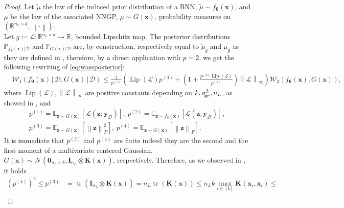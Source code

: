 \documentclass[a4paper, 11pt, reqno]{amsart}
\theoremstyle{plain}
\theoremstyle{remark}
\theoremstyle{definition}
\newcommand{\mean}[2][\kern-0.5pt]{\mathbb{E}_{#1}\left[#2\right]}
\newcommand{\given}{\, | \,}
\newcommand{\normal}[2]{\mathcal{N}\left(#1, #2\right)}
\newcommand{\wass}[3][2]{\mathcal{W}_{#1}\left(#2, #3\right)}
\newcommand{\real}{\mathbb{R}}
\newcommand{\norm}[1]{\left\lVert#1\right\rVert}
\newcommand{\lipschitz}[1]{\operatorname{Lip}\left(#1\right)}
\newcommand{\trace}[1]{\operatorname{tr}\left(#1\right)}
\newcommand{\setmuskip}[1]{%
    \thinmuskip = #1\thinmuskip
    \medmuskip = #1\thinmuskip
    \thickmuskip = #1\thinmuskip}
\newcommand{\train}{\mathcal{D}}
\newcommand{\sigmay}{\sigma_{\scalebox{0.65}{$\kern-3pt\bm{y}_{\mathcal{D}}$}}}%
\begin{document}
\begin{proof}
	Let $\widetilde{\mu}$ the law of the induced prior distribution of a BNN, $\widetilde{\mu} \sim f_{\bm{\theta}}(\bm{x})$, and $\mu$ be the law of the associated NNGP, $\mu \sim G(\bm{x})$, probability measures on $\left(\real^{n_L \times k}, \norm{\cdot}\right)$. \\
	Let $g \coloneqq \mathcal{L}: \real^{n_L \times k} \to \real$, bounded Lipschitz map.
	The posterior distributions $\mathbb{P}_{f_{\bm{\theta}}(\bm{x}) | \train}$ and $\mathbb{P}_{G(\bm{x}) | \train}$ are, by construction, respectively equal to $\widetilde{\mu}_g$ and $\mu_g$ as they are defined in , therefore, by a direct application with $p = 2$, we get the following rewriting of \cref{eq:wassposterior}:
	\begin{equation} \label{eq:wasspostcor}
		\begin{aligned}
			& \wass[1]{f_{\bm{\theta}}(\bm{x}) \given \train}{G(\bm{x}) \given \train} \leq \frac{1}{p^{(1)}} \left(\lipschitz{\mathcal{L}} p^{(3)} + \left(1 + \frac{p^{(4)} \lipschitz{\mathcal{L}}}{p^{(2)}}\right) \norm{\mathcal{L}}_{\infty}\right) \wass[2]{f_{\bm{\theta}}(\bm{x})}{G(\bm{x})},
		\end{aligned}
	\end{equation}
	where $\lipschitz{\mathcal{L}}, \norm{\mathcal{L}}_{\infty}$ are positive constants depending on $k, \sigmay^2, n_L$, as showed in , and
	\begin{equation*}
		\begin{gathered}
			p^{(1)} = \mean[\bm{z} \sim G(\bm{x})]{\mathcal{L}(\bm{z}; \bm{y}_{\mathcal{D}})}, \ p^{(2)} = \mean[\bm{z} \sim f_{\bm{\theta}}(\bm{x})]{\mathcal{L}(\bm{z}; \bm{y}_{\mathcal{D}})}, \\
			p^{(3)} = \mean[\bm{z} \sim G(\bm{x})]{\norm{\bm{z}}_F^{2}}, \ p^{(4)} = \mean[\bm{z} \sim G(\bm{x})]{\norm{\bm{z}}_F}.
		\end{gathered}
	\end{equation*}
	It is immediate that $p^{(3)}$ and $p^{(4)}$ are finite indeed they are the second and the first moment of a multivariate centered Gaussian, $G(\bm{x}) \sim \normal{\bm{0}_{n_L \times k}}{\bm{I}_{n_L} \otimes \bm{K}(\bm{x})}$, respectively. Therefore, as we observed in , it holds
	\begin{align} \label{eq:p3-4}
	(p^{(4)})^2 \leq p^{(3)} & = \trace{\bm{I}_{n_L} \otimes \bm{K}(\bm{x})} = n_L \trace{\bm{K}(\bm{x})} \leq n_L k \max_{i \in [k]} \bm{K}(\bm{x}_i, \bm{x}_i) \leq \nonumber \\

\end{align}
\end{proof}
\end{document}
